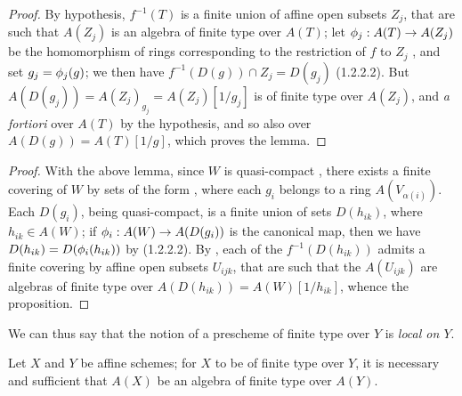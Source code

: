 \begin{proof}
By hypothesis, $f^{-1}(T)$ is a finite union of affine open subsets $Z_j$, that are such that $A(Z_j)$ is an algebra of finite type over $A(T)$;
let $\vphi_j:A(T)\to A(Z_j)$ be the homomorphism of rings corresponding to the restriction of $f$ to $Z_j$ , and set $g_j=\phi_j(g)$;
we then have $f^{-1}(D(g))\cap Z_j=D(g_j)$ (1.2.2.2).
But $A(D(g_j))=A(Z_j)_{g_j}=A(Z_j)[1/g_j]$ is of finite type over $A(Z_j)$, and \emph{a fortiori} over $A(T)$ by the hypothesis, and so also over $A(D(g))=A(T)[1/g]$, which proves the lemma.
\end{proof}

\begin{proof}
With the above lemma, since $W$ is quasi-compact , there exists a finite covering of $W$ by sets of the form , where each $g_i$ belongs to a ring $A(V_{\alpha(i)})$.
Each $D(g_i)$, being quasi-compact, is a finite union of sets $D(h_{ik})$, where $h_{ik}\in A(W)$;
if $\vphi_i:A(W)\to A(D(g_i))$ is the canonical map, then we have $D(h_{ik})=D(\phi_i(h_{ik}))$ by (1.2.2.2).
By , each of the $f^{-1}(D(h_{ik}))$ admits a finite covering by affine open subsets $U_{ijk}$, that are such that the $A(U_{ijk})$ are algebras of finite type over $A(D(h_{ik}))=A(W)[1/h_{ik}]$, whence the proposition.
\end{proof}

We
can thus say that the notion of a prescheme of finite type over $Y$ is \emph{local on $Y$}.

\begin{proposition}[6.3.3]
\label{I.6.3.3}
Let $X$ and $Y$ be affine schemes;
for $X$ to be of finite type over $Y$, it is necessary and sufficient that $A(X)$ be an algebra of finite type over $A(Y)$.
\end{proposition}

